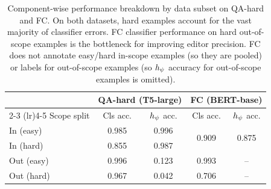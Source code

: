 \begin{table}
    \centering
    \small
    \begin{tabular}{lcccc}
        \toprule
        & \multicolumn{2}{c}{\textbf{QA-hard} (T5-large)} & \multicolumn{2}{c}{\textbf{FC} (BERT-base)} \\
        \cmidrule(lr){2-3} \cmidrule(lr){4-5}
        Scope split & Cls acc. & $h_\psi$ acc. & Cls acc. & $h_\psi$ acc. \\
        \midrule
        In (easy) & 0.985 & 0.996 & \multirow{2}{*}{0.909} & \multirow{2}{*}{0.875} \\
        In (hard) & 0.855 & 0.987 &  & \\
        Out (easy) & 0.996 & 0.123 & 0.993 & -- \\
        Out (hard) & 0.967 & 0.042 & 0.706 & -- \\
        \bottomrule
    \end{tabular}
    \caption{Component-wise {\name} performance breakdown by data subset on QA-hard and FC. On both datasets, hard examples account for the vast majority of classifier errors. FC classifier performance on hard out-of-scope examples is the bottleneck for improving editor precision. FC does not annotate easy/hard in-scope examples (so they are pooled) or labels for out-of-scope examples (so $h_\psi$ accuracy for out-of-scope examples is omitted).}
    \label{tab:decomp}
\end{table}